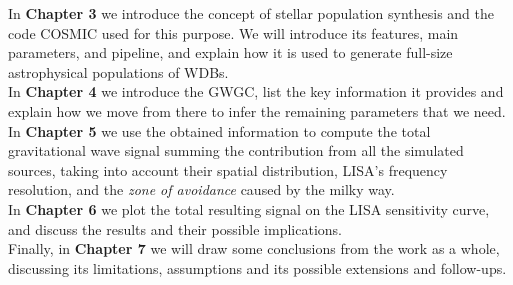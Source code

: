 In \textbf{Chapter 3} we introduce the concept of stellar population synthesis and the code COSMIC used for this purpose. We will introduce its features, main parameters, and pipeline, and explain how it is used to generate full-size astrophysical populations of WDBs.\vspace{2mm}\\ 
In \textbf{Chapter 4} we introduce the GWGC, list the key information it provides and explain how we move from there to infer the remaining parameters that we need.\vspace{2mm}\\
In \textbf{Chapter 5} we use the obtained information to compute the total gravitational wave signal summing the contribution from all the simulated sources, taking into account their spatial distribution, LISA's frequency resolution, and the \textit{zone of avoidance} caused by the milky way.\vspace{2mm}\\
In \textbf{Chapter 6} we plot the total resulting signal on the LISA sensitivity curve, and discuss the results and their possible implications.\vspace{2mm}\\
Finally, in \textbf{Chapter 7} we will draw some conclusions from the work as a whole, discussing its limitations, assumptions and its possible extensions and follow-ups.
